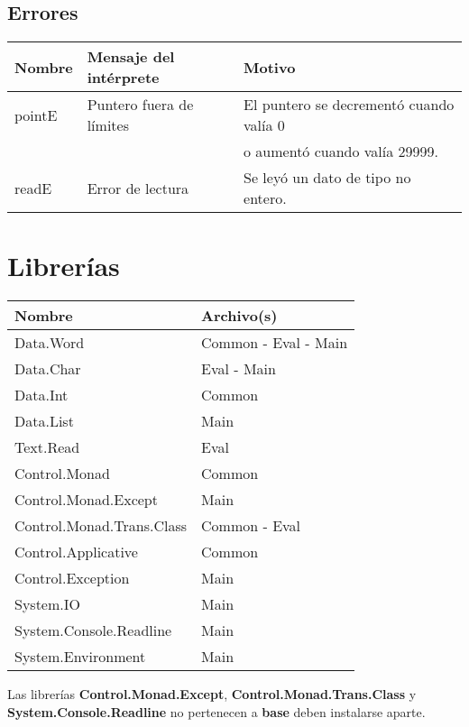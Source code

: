 \documentclass[a4paper, 12pt]{article}
\begin{document}
\subsection*{Errores}
\begin{center}
\begin{tabular}{ |l|l|l| } 
 \hline
 Nombre & Mensaje del intérprete & Motivo \\
 \hline
 pointE & Puntero fuera de límites & El puntero se decrementó cuando valía 0 \\
        &                          & o aumentó cuando valía 29999. \\
 readE & Error de lectura & Se leyó un dato de tipo no entero. \\
 \hline
\end{tabular}
\end{center}




\section*{Librerías}
\begin{center}
\begin{tabular}{ |l|l| } 
 \hline
 Nombre & Archivo(s) \\
 \hline
 Data.Word & Common - Eval - Main \\
 Data.Char & Eval - Main \\
 Data.Int & Common \\
 Data.List & Main \\
 Text.Read & Eval \\
 Control.Monad & Common \\
 Control.Monad.Except & Main \\ 
 Control.Monad.Trans.Class & Common - Eval \\
 Control.Applicative & Common \\
 Control.Exception & Main \\ 
 System.IO & Main \\ 
 System.Console.Readline & Main \\ 
 System.Environment & Main \\ 
 \hline
\end{tabular}
\end{center}

Las librerías \textbf{Control.Monad.Except}, \textbf{Control.Monad.Trans.Class} y \textbf{System.Console.Readline} no pertenecen a \textbf{base} deben instalarse aparte.




\newpage
\nocite{*}
\printbibliography[title={Referencias}]
\end{document}
